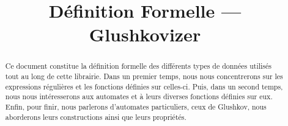 \documentclass[12pt]{article}
\title{Définition Formelle --- Glushkovizer}
\author{}
\date{}
\theoremstyle{definition}
\begin{document}
\maketitle

\begin{abstract}
    Ce document constitue la définition formelle des différents types de
    données utilisés tout au long de cette librairie. Dans un premier temps,
    nous nous concentrerons sur les expressions régulières et les fonctions
    définies sur celles-ci. Puis, dans un second temps, nous nous intéresserons
    aux automates et à leurs diverses fonctions définies sur eux. Enfin, pour
    finir, nous parlerons d’automates particuliers, ceux de Glushkov, nous
    aborderons leurs constructions ainsi que leurs propriétés.
\end{abstract}

\newpage

\tableofcontents











\printbibliography[title=Bibliographie]
\end{document}
